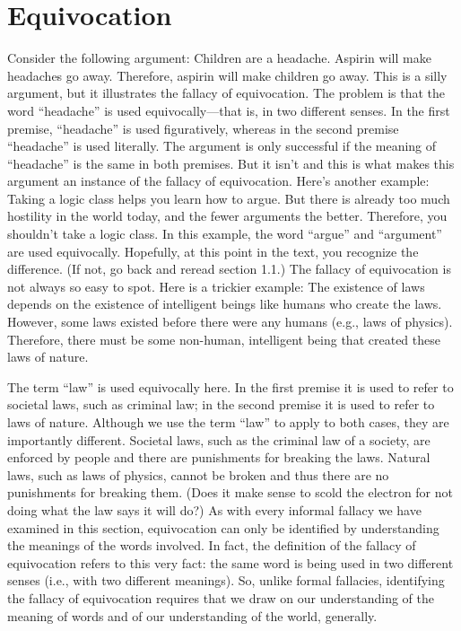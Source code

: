 \section{Equivocation}

Consider the following argument:
Children are a headache. Aspirin will make headaches go away.
Therefore, aspirin will make children go away.
This is a silly argument, but it illustrates the fallacy of equivocation. The problem
is that the word ``headache'' is used equivocally—that is, in two different senses.
In the first premise, ``headache'' is used figuratively, whereas in the second
premise ``headache'' is used literally. The argument is only successful if the
meaning of ``headache'' is the same in both premises. But it isn't and this is
what makes this argument an instance of the fallacy of equivocation.
Here's another example:
Taking a logic class helps you learn how to argue. But there is already
too much hostility in the world today, and the fewer arguments the better.
Therefore, you shouldn't take a logic class.
In this example, the word ``argue'' and ``argument'' are used equivocally.
Hopefully, at this point in the text, you recognize the difference. (If not, go back
and reread section 1.1.)
The fallacy of equivocation is not always so easy to spot. Here is a trickier
example:
The existence of laws depends on the existence of intelligent beings like
humans who create the laws. However, some laws existed before there
were any humans (e.g., laws of physics). Therefore, there must be some
non-human, intelligent being that created these laws of nature.

The term ``law'' is used equivocally here. In the first premise it is used to refer to
societal laws, such as criminal law; in the second premise it is used to refer to
laws of nature. Although we use the term ``law'' to apply to both cases, they are
importantly different. Societal laws, such as the criminal law of a society, are
enforced by people and there are punishments for breaking the laws. Natural
laws, such as laws of physics, cannot be broken and thus there are no
punishments for breaking them. (Does it make sense to scold the electron for
not doing what the law says it will do?)
As with every informal fallacy we have examined in this section, equivocation
can only be identified by understanding the meanings of the words involved. In
fact, the definition of the fallacy of equivocation refers to this very fact: the same
word is being used in two different senses (i.e., with two different meanings). So,
unlike formal fallacies, identifying the fallacy of equivocation requires that we
draw on our understanding of the meaning of words and of our understanding
of the world, generally.

